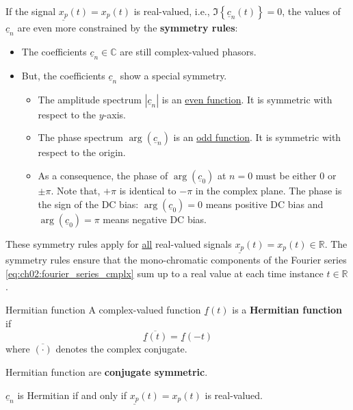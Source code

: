 \begin{refsection}
If the signal $\underline{x_p}(t) = x_p(t)$ is real-valued, i.e., $\Im\left\{\underline{c}_n(t)\right\} = 0$, the values of $\underline{c}_n$ are even more constrained by the  \textbf{symmetry rules}:
\begin{itemize}
	\item The coefficients $\underline{c}_n \in \mathbb{C}$ are still complex-valued phasors.
	\item But, the coefficients $\underline{c}_n$ show a special symmetry.
	\begin{itemize}
		\item The amplitude spectrum $|\underline{c}_n|$ is an \underline{even function}. It is symmetric with respect to the $y$-axis.
		\item The phase spectrum $\arg\left(\underline{c}_n\right)$ is an \underline{odd function}. It is symmetric with respect to the origin.
		\item As a consequence, the phase of $\arg\left(\underline{c}_0\right)$ at $n = 0$ must be either $0$ or $\pm \pi$. Note that, $+\pi$ is identical to $-\pi$ in the complex plane. The phase is the sign of the \ac{DC} bias: $\arg\left(\underline{c}_0\right) = 0$ means positive \ac{DC} bias and $\arg\left(\underline{c}_0\right) = \pi$ means negative \ac{DC} bias.
	\end{itemize}
\end{itemize}
These symmetry rules apply for \underline{all} real-valued signals $\underline{x_p}(t) = x_p(t) \in \mathbb{R}$. The symmetry rules ensure that the mono-chromatic components of the Fourier series \eqref{eq:ch02:fourier_series_cmplx} sum up to a real value at each time instance $t \in \mathbb{R}$.

\begin{definition}{Hermitian function}
	A complex-valued function $\underline{f}(t)$ is a  \textbf{Hermitian function} if
	\begin{equation}
		\overline{\underline{f}(t)} = \underline{f}(-t)
		\label{eq:ch02:hermitian}
	\end{equation}%
	where $\overline{\left(\cdot\right)}$ denotes the complex conjugate.
	
	Hermitian function are  \textbf{conjugate symmetric}.
\end{definition}

$\underline{c}_n$ is Hermitian if and only if $\underline{x_p}(t) = x_p(t)$ is real-valued.


\end{refsection}

